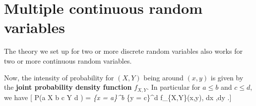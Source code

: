 \documentclass[
  letterpaper,
]{report}
\theoremstyle{definition}
\theoremstyle{definition}
\theoremstyle{remark}
\begin{document}
\hypertarget{continuous-multiple}{%
\section{Multiple continuous random
variables}\label{continuous-multiple}}

The theory we set up for two or more discrete random variables also
works for two or more continuous random variables.

Now, the intensity of probability for \((X,Y)\) being around \((x,y)\)
is given by the \textbf{joint probability density function} \(f_{X,Y}\).
In particular for \(a \leq b\) and \(c \leq d\), we have {[} \mathbb P(a
\leq X \leq b  c \leq Y \leq d ) = \int\emph{\{x = a\}\^{}b
\int}\{y = c\}\^{}d f\_\{X,Y\}(x,y), \mathrm dx ,\mathrm dy .{]}
\end{document}
